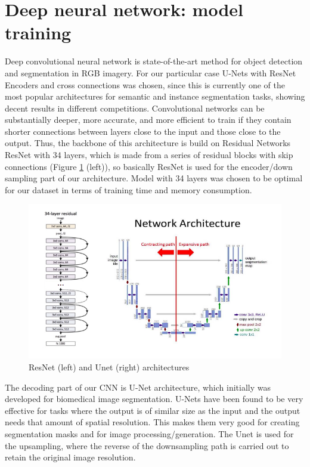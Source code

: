 \section{Deep neural network: model training}

Deep convolutional neural network is state-of-the-art method for object detection and segmentation in RGB imagery. For our particular case U-Nets with ResNet Encoders and cross connections was chosen, since this is currently one of the most popular architectures for semantic and instance segmentation tasks, showing decent results in different competitions. Convolutional networks can be substantially deeper, more accurate, and more efficient to train if they contain shorter connections between layers close to the input and those close to the output. Thus, the backbone of this architecture is build on Residual Networks \gls{ResNet} with 34 layers, which is made from a series of residual blocks with skip connections (Figure \ref{CNN} (left)), so basically ResNet is used for the encoder/down sampling part of our architecture. Model with 34 layers was chosen to be optimal for our dataset in terms of training time and memory consumption. 

\begin{figure}[ht]
\centering
\includegraphics[scale=0.7]{images/CNNArch.png}
\caption{\gls{ResNet} (left) and \gls{Unet} (right) architectures
} 
\label{CNN}
\end{figure}


The decoding part of our \gls{CNN} is U-Net architecture, which initially was developed for biomedical image segmentation. U-Nets have been found to be very effective for tasks where the output is of similar size as the input and the output needs that amount of spatial resolution. This makes them very good for creating segmentation masks and for image processing/generation.
The \gls{Unet} is used for the upsampling, where the reverse of the downsampling path is carried out to retain the original image resolution.

